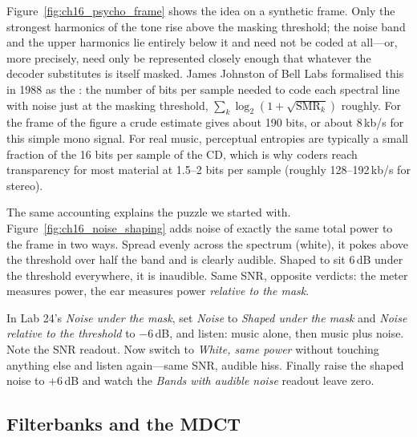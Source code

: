 Figure~\ref{fig:ch16_psycho_frame} shows the idea on a synthetic frame. Only the strongest harmonics
of the tone rise above the masking threshold; the noise band and the upper harmonics lie entirely
below it and need not be coded at all---or, more precisely, need only be represented closely enough
that whatever the decoder substitutes is itself masked. James Johnston of Bell Labs formalised this
in 1988 as the : the number of bits per sample needed to code each spectral
line with noise just at the masking threshold, $\sum_k\log_2(1+\sqrt{\text{SMR}_k})$ roughly. For the
frame of the figure a crude estimate gives about 190 bits, or about 8\,kb/s for this simple mono
signal. For real music, perceptual entropies are typically a small fraction of the 16 bits per sample
of the CD, which is why coders reach transparency for most material at 1.5--2 bits per sample
(roughly 128--192\,kb/s for stereo).


The same accounting explains the puzzle we started with. Figure~\ref{fig:ch16_noise_shaping} adds
noise of exactly the same total power to the frame in two ways. Spread evenly across the spectrum
(white), it pokes above the threshold over half the band and is clearly audible. Shaped to sit 6\,dB
under the threshold everywhere, it is inaudible. Same SNR, opposite verdicts: the meter measures
power, the ear measures power \emph{relative to the mask}.

\begin{tryit}
In Lab 24's \emph{Noise under the mask}, set \emph{Noise} to \emph{Shaped under the mask} and
\emph{Noise relative to the threshold} to $-6$\,dB, and listen: music alone, then music plus noise.
Note the SNR readout. Now switch to \emph{White, same power} without touching anything else and
listen again---same SNR, audible hiss. Finally raise the shaped noise to $+6$\,dB and watch the
\emph{Bands with audible noise} readout leave zero.
\end{tryit}

\subsection{Filterbanks and the MDCT}

